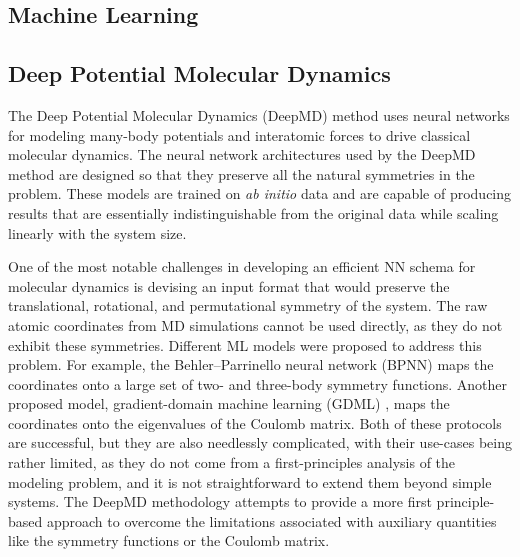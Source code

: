 \subsection{Machine Learning}

\subsection{Deep Potential Molecular Dynamics}

The Deep Potential Molecular Dynamics (DeepMD) \parencite{Zhang_2018} method
uses neural networks for modeling many-body potentials and interatomic forces
to drive classical molecular dynamics. The neural network architectures used
by the DeepMD method are designed so that they preserve all the natural
symmetries in the problem. These models are trained on \textit{ab initio} data
and are capable of producing results that are essentially indistinguishable
from the original data while scaling linearly with the system size.

One of the most notable challenges in developing an efficient NN schema for
molecular dynamics is devising an input format that would preserve the
translational, rotational, and permutational symmetry of the system. The raw
atomic coordinates from MD simulations cannot be used directly, as they do not
exhibit these symmetries. Different ML models were proposed to address this
problem. For example, the Behler--Parrinello neural network (BPNN)
\parencite{PhysRevLett.98.146401} maps the coordinates onto a large set of
two- and three-body symmetry functions. Another proposed model,
gradient-domain machine learning (GDML)
\parencite{doi:10.1126/sciadv.1603015}, maps the coordinates onto the
eigenvalues of the Coulomb matrix. Both of these protocols are successful, but
they are also needlessly complicated, with their use-cases being rather
limited, as they do not come from a first-principles analysis of the modeling
problem, and it is not straightforward to extend them beyond simple systems.
The DeepMD methodology attempts to provide a more first principle-based
approach to overcome the limitations associated with auxiliary quantities like
the symmetry functions or the Coulomb matrix.

